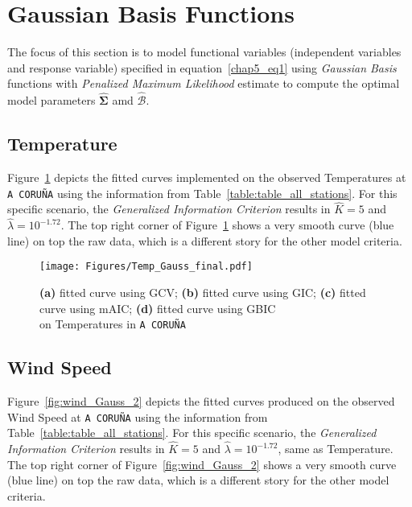\section{Gaussian Basis Functions}

The focus of this section is to model functional variables (independent variables and response variable) specified in equation~\eqref{chap5_eq1} using \textit{Gaussian Basis} functions with \textit{Penalized Maximum Likelihood} estimate to compute the optimal model parameters $\hat{\bm{\Sigma}}$ amd $\hat{\bm{\mathcal{B}}}$.

\subsection{Temperature}
Figure~\ref{fig:Temp_Gauss} depicts the fitted curves implemented on the observed Temperatures at \texttt{A CORUÑA} using the information from Table~\ref{table:table_all_stations}. For this specific scenario, the \textit{Generalized Information Criterion} results in $\hat{K} = 5$ and $\hat{\lambda} = 10^{-1.72}$. The top right corner of Figure~\ref{fig:Temp_Gauss} shows a very smooth curve (blue line) on top the raw data, which is a different story for the other model criteria.

\begin{figure}[th]
    \texttt{[image: Figures/Temp\_Gauss\_final.pdf]}
  \caption[Fitting Temperature with \textit{Gaussian basis function} on \texttt{A CORUÑA} station]{\textbf{(a)} fitted curve using GCV; \textbf{(b)} fitted curve using GIC; \textbf{(c)} fitted curve using mAIC; \textbf{(d)} fitted curve using GBIC \\ on Temperatures in \texttt{A CORUÑA} }
  \label{fig:Temp_Gauss}
\end{figure}
\clearpage
\subsection{Wind Speed}
Figure~\ref{fig:wind_Gauss_2} depicts the fitted curves produced on the observed Wind Speed at \texttt{A CORUÑA} using the information from Table~\ref{table:table_all_stations}. For this specific scenario, the \textit{Generalized Information Criterion} results in $\hat{K} = 5$ and $\hat{\lambda} = 10^{-1.72}$, same as Temperature. The top right corner of Figure~\ref{fig:wind_Gauss_2} shows a very smooth curve (blue line) on top the raw data, which is a different story for the other model criteria.

